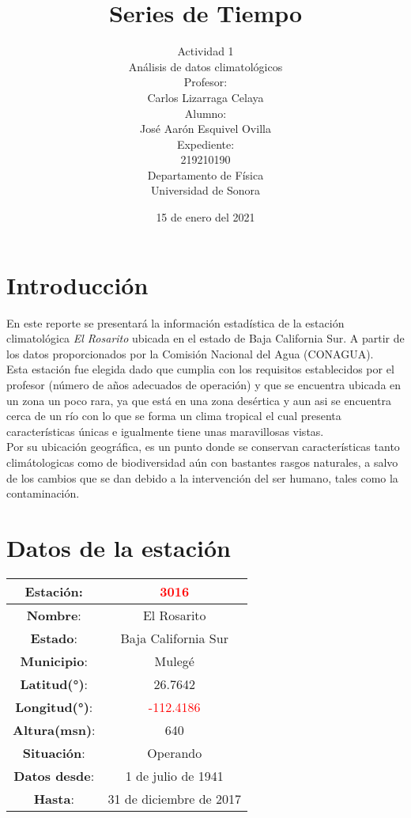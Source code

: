 \documentclass{article}
\title{ Series de Tiempo}
\author{Actividad 1\\
Análisis de datos climatológicos\\
Profesor:\\
Carlos Lizarraga Celaya \\
Alumno:\\
José Aarón Esquivel Ovilla \\
Expediente:\\
219210190\\
        Departamento de Física \\
        Universidad de Sonora}
\date{15 de enero del 2021}
\begin{document}
\maketitle

\clearpage

\section{Introducción}
En este reporte se presentará la información estadística de la estación climatológica \textit{El Rosarito} ubicada en el estado de Baja California Sur. A partir de los datos proporcionados por la Comisión Nacional del Agua (CONAGUA).\\

Esta estación fue elegida dado que cumplia con los requisitos establecidos por el profesor (número de años adecuados de operación) y que se encuentra ubicada en un zona un poco rara, ya que está en una zona desértica y aun asi se encuentra cerca de un río con lo que se forma un clima tropical el cual presenta características únicas e igualmente tiene unas maravillosas vistas.\\
Por su ubicación geográfica, es un punto donde se conservan características tanto climátologicas como de biodiversidad aún con bastantes rasgos naturales,  a salvo de los cambios que se dan debido a la intervención del ser humano, tales  como la contaminación.  

\section{Datos de la estación}
\begin{center}
\begin{tabular}{|c|c|} \hline
 \textbf{Estación}:& \textcolor{red}{3016} \\ \hline
 \textbf{Nombre}:    & El Rosarito \\ \hline
 \textbf{Estado}: & Baja California Sur \\ \hline
 \textbf{Municipio}: & Mulegé \\ \hline
 \textbf{Latitud(°)}: & 26.7642 \\ \hline
 \textbf{Longitud(°)}: & \textcolor{red}{-112.4186} \\ \hline
 \textbf{Altura(msn)}: & 640 \\ \hline
 \textbf{Situación}: & Operando \\ \hline
 \textbf{Datos desde}: & 1 de julio de 1941 \\ \hline
 \textbf{Hasta}: & 31 de diciembre de 2017 \\ \hline
 
\end{tabular}

\end{center}
\end{document}
